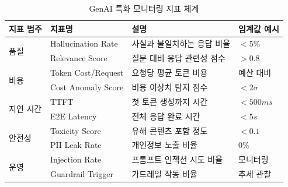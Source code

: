 \begin{table}[htbp]
\centering
\caption{GenAI 특화 모니터링 지표 체계}
\label{tab:14_genai_metrics}
\begin{tabularx}{\textwidth}{p{2.2cm}p{2.8cm}Xp{2cm}}
\toprule
\textbf{지표 범주} & \textbf{지표명} & \textbf{설명} & \textbf{임계값 예시} \\
\midrule
\multirow{2}{*}{품질} & Hallucination Rate & 사실과 불일치하는 응답 비율 & $< 5\%$ \\
 & Relevance Score & 질문 대비 응답 관련성 점수 & $> 0.8$ \\
\midrule
\multirow{2}{*}{비용} & Token Cost/Request & 요청당 평균 토큰 비용 & 예산 대비 \\
 & Cost Anomaly Score & 비용 이상치 탐지 점수 & $< 2\sigma$ \\
\midrule
\multirow{2}{*}{지연 시간} & TTFT & 첫 토큰 생성까지 시간 & $< 500ms$ \\
 & E2E Latency & 전체 응답 완료 시간 & $< 5s$ \\
\midrule
\multirow{2}{*}{안전성} & Toxicity Score & 유해 콘텐츠 포함 정도 & $< 0.1$ \\
 & PII Leak Rate & 개인정보 노출 비율 & $0\%$ \\
\midrule
\multirow{2}{*}{운영} & Injection Rate & 프롬프트 인젝션 시도 비율 & 모니터링 \\
 & Guardrail Trigger & 가드레일 작동 비율 & 추세 관찰 \\
\bottomrule
\end{tabularx}
\end{table}

